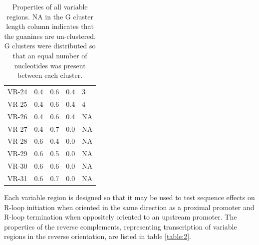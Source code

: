 \documentclass[11pt]{article}
\begin{document}
\begin{table}
\begin{tabular}{lrrrl}
	VR-24 &      0.4 &         0.6 &      0.4 &              3 \\
	VR-25 &      0.4 &         0.6 &      0.4 &              4 \\
	VR-26 &      0.4 &         0.6 &      0.4 &             NA \\
	VR-27 &      0.4 &         0.7 &      0.0 &             NA \\
	VR-28 &      0.6 &         0.4 &      0.0 &             NA \\
	VR-29 &      0.6 &         0.5 &      0.0 &             NA \\
	VR-30 &      0.6 &         0.6 &      0.0 &             NA \\
	VR-31 &      0.6 &         0.7 &      0.0 &             NA \\
	\bottomrule
\end{tabular}
\caption{Properties of all variable regions. NA in the G cluster length column indicates that the guanines are un-clustered. G clusters were distributed so that an equal number of nucleotides was present between each cluster.}
\label{table:1}
\end{table}


Each variable region is designed so that it may be used to test sequence effects on R-loop initiation when oriented in the same direction as a proximal promoter and R-loop termination when oppositely oriented to an upstream promoter. The properties of the reverse complements, representing transcription of variable regions in the reverse orientation, are listed in table \ref{table:2}. 
\end{document}
